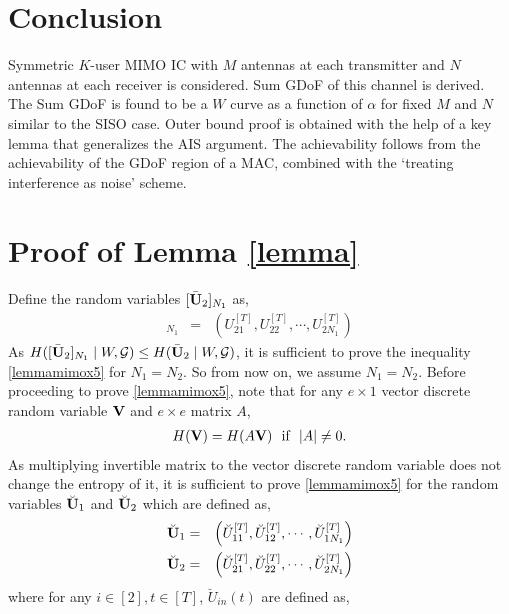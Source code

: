 \documentclass[11pt]{article}
\begin{document}
 
\section{Conclusion}
Symmetric $K$-user MIMO IC with $M$ antennas at each transmitter and $N$ antennas at each receiver is considered. Sum GDoF of this channel is derived. The Sum GDoF  is found to be a $W$ curve as a function of $\alpha$ for fixed  $M$ and $N$ similar to the SISO case. Outer bound proof is obtained with the help of a key lemma that generalizes the AIS argument.  The achievability follows from the achievability of the GDoF region of a MAC, combined with the `treating interference as noise' scheme. 

\appendix

\section{Proof of Lemma \ref{lemma}}\label{lemmap}
 Define the random variables $[\bar{\bf U}_2]_{N_1}$ as,
\begin{eqnarray}
[\bar{\bf U}_2]_{N_1}&=&\left({U}_{21}^{[T]},{U}_{22}^{[T]},\cdots,{U}_{2N_1}^{[T]}\right)\label{lemmamimox2+}
\end{eqnarray}
As $H([{\bar{\bf U}}_2]_{N_1}\mid {W},\mathcal{G})\le H({\bar{\bf U}}_2\mid {W},\mathcal{G})$, it is sufficient to prove the inequality \eqref{lemmamimox5} for $N_1=N_2$. So from now on, we assume $N_1=N_2$. Before proceeding to prove \eqref{lemmamimox5}, note that for any $e\times1$ vector discrete random variable ${\bf V}$ and $e\times e$ matrix $A$,
\begin{eqnarray}
 H({\bf V})=H(A{\bf V})\text{~~if~~} |A|\neq0.
\end{eqnarray}
As multiplying invertible matrix to the vector discrete random variable does not change the entropy of it, it is sufficient to prove \eqref{lemmamimox5} for the random variables $\breve{\bf U}_{1}$ and $\breve{\bf U}_{2}$ which are defined as,
\begin{eqnarray}
\breve{\bf U}_1&=&\left(\breve{U}_{11}^{[T]},\breve{U}_{12}^{[T]},\cdots,\breve{U}_{1N_1}^{[T]}\right)\label{lemmamimox7}\\
\breve{\bf U}_2&=&\left(\breve{U}_{21}^{[T]},\breve{U}_{22}^{[T]},\cdots,\breve{U}_{2N_1}^{[T]}\right)\label{lemmamimox8}
\end{eqnarray}
where for any $i\in[2],t\in[T]$, $\breve{U}_{in}(t)$ are defined as,
\end{document}
